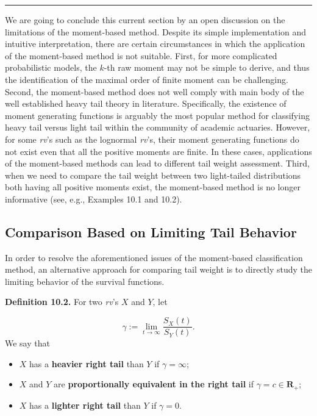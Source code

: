 \documentclass[]{book}
\providecommand{\tightlist}{%
  \setlength{\itemsep}{0pt}\setlength{\parskip}{0pt}}
\theoremstyle{definition}
\theoremstyle{definition}
\theoremstyle{definition}
\theoremstyle{remark}
\begin{document}
\begin{center}\rule{0.5\linewidth}{\linethickness}\end{center}

We are going to conclude this current section by an open discussion on
the limitations of the moment-based method. Despite its simple
implementation and intuitive interpretation, there are certain
circumstances in which the application of the moment-based method is not
suitable. First, for more complicated probabilistic models, the \(k\)-th
raw moment may not be simple to derive, and thus the identification of
the maximal order of finite moment can be challenging. Second, the
moment-based method does not well comply with main body of the well
established heavy tail theory in literature. Specifically, the existence
of moment generating functions is arguably the most popular method for
classifying heavy tail versus light tail within the community of
academic actuaries. However, for some \emph{rv}'s such as the lognormal
\emph{rv}'s, their moment generating functions do not exist even that
all the positive moments are finite. In these cases, applications of the
moment-based methods can lead to different tail weight assessment.
Third, when we need to compare the tail weight between two light-tailed
distributions both having all positive moments exist, the moment-based
method is no longer informative (see, e.g., Examples 10.1 and 10.2).

\subsection{Comparison Based on Limiting Tail
Behavior}\label{comparison-based-on-limiting-tail-behavior}

In order to resolve the aforementioned issues of the moment-based
classification method, an alternative approach for comparing tail weight
is to directly study the limiting behavior of the survival functions.

\textbf{Definition 10.2.} For two \emph{rv}'s \(X\) and \(Y\), let

\[
\gamma:=\lim_{t\rightarrow \infty}\frac{S_X(t)}{S_Y(t)}.
\] We say that

\begin{itemize}
\tightlist
\item
  \(X\) has a \textbf{heavier right tail} than \(Y\) if
  \(\gamma=\infty\);\\
\item
  \(X\) and \(Y\) are \textbf{proportionally equivalent in the right
  tail} if \(\gamma =c\in \mathbf{R}_+\);
\item
  \(X\) has a \textbf{lighter right tail} than \(Y\) if \(\gamma=0\).
\end{itemize}
\end{document}
